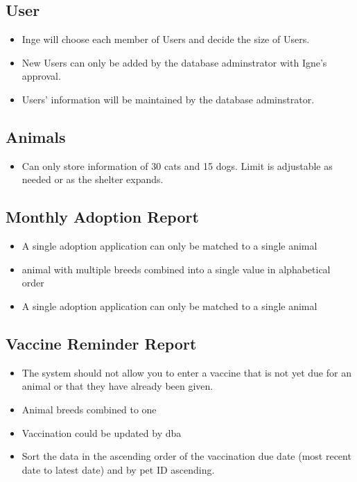 \documentclass[a4paper]{article}
\begin{document}
\subsection*{User}

\begin{itemize}
	\item Inge will choose each member of Users and decide the size of Users.
	\item New Users can only be added by the database adminstrator with Igne's approval.
	\item Users' information will be maintained by the database adminstrator.
\end{itemize}

\subsection*{Animals}

\begin{itemize}
	\item Can only store information of 30 cats and 15 dogs. Limit is adjustable as needed or as the shelter expands.
\end{itemize}

\subsection*{Monthly Adoption Report}
\begin{itemize}
	\item  A single adoption application can only be matched to a single animal
	\item  animal with multiple breeds combined into a single value in alphabetical order
	\item  A single adoption application can only be matched to a single animal

\end{itemize}

\subsection*{Vaccine Reminder Report}
\begin{itemize}

    \item The system should not allow you to enter a vaccine that is not yet due for an animal or that they have already been given.
    \item Animal breeds combined to one
    \item Vaccination could be updated by dba
    \item Sort the data in the ascending order of the vaccination due date (most recent date to latest date) and by pet ID ascending.

\end{itemize}
\end{document}
